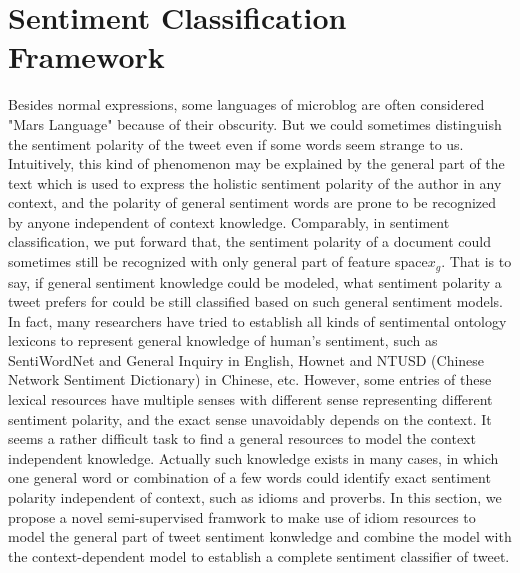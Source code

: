 \documentclass{llncs}
\begin{document}
\section{Sentiment Classification Framework}
\label{framework}
Besides normal expressions, some languages of microblog are often considered "Mars Language" because of their obscurity. 
But we could sometimes distinguish the sentiment polarity of the tweet even if some words seem strange to us.
Intuitively, this kind of phenomenon may be explained by the general part of the text which is used to express the holistic sentiment polarity of the author in any context, and the polarity of general sentiment words are prone to be recognized by anyone independent of context knowledge. 
Comparably, in sentiment classification, we put forward that, the sentiment polarity of a document could sometimes still be recognized with only general part of feature space$ x_{g} $. 
That is to say, if general sentiment knowledge could be modeled, what sentiment polarity a tweet prefers for could be still classified based on such general sentiment models.\\
In fact, many researchers have tried to establish all kinds of sentimental ontology lexicons to represent general knowledge of human’s sentiment, such as SentiWordNet\cite{xsongx:b17} and General Inquiry\cite{xsongx:b18} in English, Hownet\cite{xsongx:b19} and NTUSD (Chinese Network Sentiment Dictionary) in Chinese\cite{xsongx:b20}, etc. 
However, some entries of these lexical resources have multiple senses with different sense representing different sentiment polarity, and the exact sense unavoidably depends on the context.
It seems a rather difficult task to find a general resources to model the context independent knowledge.
Actually such knowledge exists in many cases, in which one general word or combination of a few words could identify exact sentiment polarity independent of context, such as idioms and proverbs. 
In this section, we propose a novel semi-supervised framwork to make use of idiom resources to model the general part of tweet sentiment konwledge and combine the model with 
the context-dependent model to establish a complete sentiment classifier of tweet.
\end{document}
